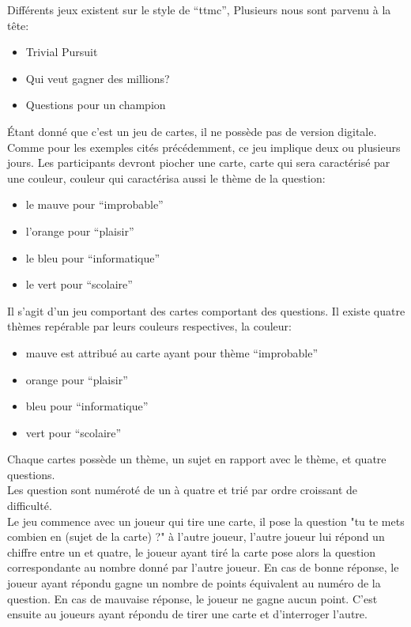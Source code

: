 Différents jeux existent sur le style de ``\acrlong{ttmc}'', Plusieurs nous sont parvenu à la tête:
\begin{itemize}
	\item Trivial Pursuit
	\item Qui veut gagner des millions?
	\item Questions pour un champion
\end{itemize}
Étant donné que c'est un jeu de cartes, il ne possède pas de version digitale. Comme pour les exemples cités précédemment, ce jeu implique deux ou plusieurs jours. Les participants devront piocher une carte, carte qui sera caractérisé par une couleur, couleur qui caractérisa aussi le thème de la question:
\begin{itemize}
	\item le mauve pour ``improbable''
	\item l'orange pour ``plaisir''
	\item le bleu pour ``informatique''
	\item le vert pour ``scolaire''
\end{itemize} 

Il s'agit d'un jeu comportant des cartes comportant des questions. Il existe quatre thèmes repérable par leurs couleurs respectives, la couleur:
\begin{itemize}
	\item mauve est attribué au carte ayant pour thème ``improbable''
	\item orange pour ``plaisir''
	\item bleu pour ``informatique''
	\item vert pour ``scolaire''
\end{itemize}
Chaque cartes possède un thème, un sujet en rapport avec le thème, et quatre questions.\\
Les question sont numéroté de un à quatre et trié par ordre croissant de difficulté.\\
Le jeu commence avec un joueur qui tire une carte, il pose la question "tu te mets combien en (sujet de la carte) ?" à l'autre joueur, l'autre joueur lui répond un chiffre entre un et quatre, le joueur ayant tiré la carte pose alors la question correspondante au nombre donné par l'autre joueur. En cas de bonne réponse, le joueur ayant répondu gagne un nombre de points équivalent au numéro de la question. En cas de mauvaise réponse, le joueur ne gagne aucun point. C'est ensuite au joueurs ayant répondu de tirer une carte et d'interroger l'autre.
